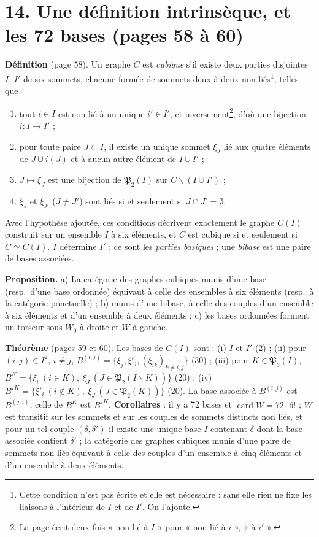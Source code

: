 \documentclass[11pt,a4paper]{article}
\begin{document}
\section*{14. Une définition intrinsèque, et les 72 bases (pages 58 à 60)}

\textbf{Définition} (page 58). Un graphe $C$ est \emph{cubique} s'il existe
deux parties disjointes $I$, $I'$ de six sommets, chacune formée de sommets
deux à deux non liés\footnote{Cette condition n'est pas écrite et elle est
nécessaire : sans elle rien ne fixe les liaisons à l'intérieur de $I$ et de
$I'$. On l'ajoute.}, telles que

\begin{enumerate}
\item[b)] tout $i \in I$ est non lié à un unique $i' \in I'$, et
  inversement\footnote{La page écrit deux fois « non lié à $I$ » pour « non
  lié à $i$ », « à $i'$ ».}, d'où une bijection $i : I \to I'$ ;
\item[c)] pour toute paire $J \subset I$, il existe un unique sommet $\xi_J$
  lié aux quatre éléments de $J \cup i(J)$ et à aucun autre élément de $I \cup
  I'$ ;
\item[d)] $J \mapsto \xi_J$ est une bijection de $\mathfrak{P}_2(I)$ sur $C
  \smallsetminus (I \cup I')$ ;
\item[e)] $\xi_J$ et $\xi_{J'}$ ($J \neq J'$) sont liés si et seulement si $J
  \cap J' = \emptyset$.
\end{enumerate}

Avec l'hypothèse ajoutée, ces conditions décrivent exactement le graphe
$C(I)$ construit sur un ensemble $I$ à six éléments, et $C$ est cubique si et
seulement si $C \simeq C(I)$. $I$ détermine $I'$ ; ce sont les \emph{parties
basiques} ; une \emph{bibase} est une paire de bases associées.

\textbf{Proposition.} a) La catégorie des graphes cubiques munis d'une base
(resp.\ d'une base ordonnée) équivaut à celle des ensembles à six éléments
(resp.\ à la catégorie ponctuelle) ; b) munis d'une bibase, à celle des couples
d'un ensemble à six éléments et d'un ensemble à deux éléments ; c) les bases
ordonnées forment un torseur sous $W_0$ à droite et $W$ à gauche.

\textbf{Théorème} (pages 59 et 60). Les bases de $C(I)$ sont : (i) $I$ et $I'$
(2) ; (ii) pour $(i, j) \in I^2$, $i \neq j$, $B^{(i,j)} = \lbrace \xi_j,
\xi'_j, (\xi_{ik})_{k \neq i, j}\rbrace$ (30) ; (iii) pour $K \in
\mathfrak{P}_3(I)$, $B^K = \lbrace \xi_i \ (i \in K), \ \xi_J \ (J \in
\mathfrak{P}_2(I \smallsetminus K))\rbrace$ (20) ; (iv) $B'^K = \lbrace \xi'_i \ (i \notin K), \ \xi_J \ (J \in \mathfrak{P}_2(K))\rbrace$ (20). La base associée
à $B^{(i,j)}$ est $B^{(j,i)}$, celle de $B^K$ est $B'^K$. \textbf{Corollaires} :
il y a 72 bases et $\operatorname{card} W = 72 \cdot 6!$ ; $W$ est transitif
sur les sommets et sur les couples de sommets distincts non liés, et pour un
tel couple $(\delta, \delta')$ il existe une unique base $I$ contenant $\delta$
dont la base associée contient $\delta'$ ; la catégorie des graphes cubiques
munis d'une paire de sommets non liés équivaut à celle des couples d'un
ensemble à cinq éléments et d'un ensemble à deux éléments.
\end{document}
